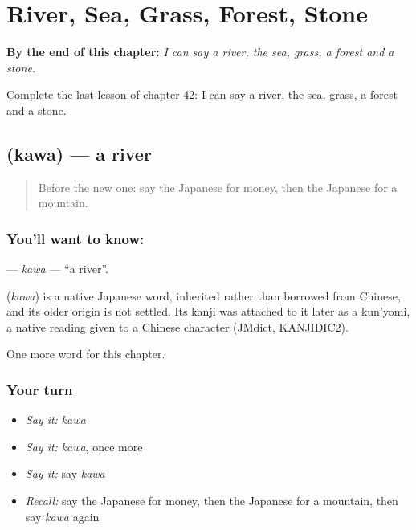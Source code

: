 
\chapter{River, Sea, Grass, Forest, Stone}
\label{ch:ja-river-sea-grass-forest-stone}

\begin{chapteropening}
\textbf{By the end of this chapter:} \emph{I can say a river, the sea, grass, a forest and a stone.}

Complete the last lesson of chapter 42: I can say a river, the sea, grass, a forest and a stone.
\end{chapteropening}

\section[\texorpdfstring{\ja{かわ} (kawa)}{かわ (kawa)}]{ (kawa) — a river}

\label{lesson:JA-C42-kawa}



\begin{quote}
Before the new one: say the Japanese for money, then the Japanese for a mountain.
\end{quote}

\subsection*{You'll want to know: }
\textbf{} — \emph{kawa} — \textquotedblleft{}a river\textquotedblright{}.

\begin{cousinweb}
\textbf{} (\emph{kawa}) is a native Japanese word, inherited rather than borrowed from Chinese, and its older origin is not settled. Its kanji was attached to it later as a kun'yomi, a native reading given to a Chinese character (JMdict, KANJIDIC2).
\end{cousinweb}

\begin{grammarlens}[title={What you've built}]
One more word for this chapter.
\end{grammarlens}

\subsection*{Your turn}
\begin{itemize}
\raggedright
  \item \emph{Say it:} \emph{kawa}
  \item \emph{Say it:} \emph{kawa}, once more
  \item \emph{Say it:} say \emph{kawa}
  \item \emph{Recall:} say the Japanese for money, then the Japanese for a mountain, then say \emph{kawa} again
\end{itemize}

